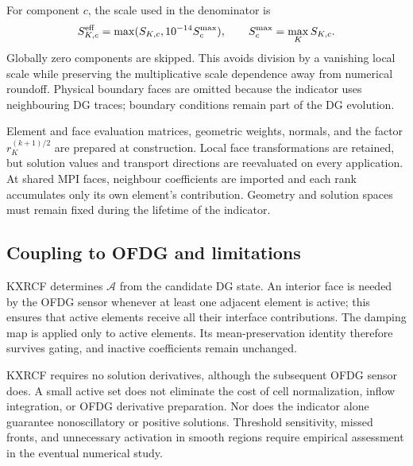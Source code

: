 For component $c$, the scale used in the denominator is
\begin{equation}
 S_{K,c}^{\rm eff}=\max(S_{K,c},10^{-14}S_c^{\max}),
 \qquad S_c^{\max}=\max_K S_{K,c}.
\end{equation}
Globally zero components are skipped.
This avoids division by a vanishing local scale while preserving the
multiplicative scale dependence away from numerical roundoff. Physical
boundary faces are omitted because the indicator uses neighbouring DG traces;
boundary conditions remain part of the DG evolution.

Element and face evaluation matrices, geometric weights, normals, and the
factor $r_K^{(k+1)/2}$ are prepared at construction. Local face transformations
are retained, but solution values and transport directions are reevaluated
on every application. At shared MPI faces, neighbour coefficients are imported
and each rank accumulates only its own element's contribution. Geometry and
solution spaces must remain fixed during the lifetime of the indicator.

\subsection{Coupling to OFDG and limitations}
KXRCF determines $\mathcal A$ from the candidate DG state. An interior face is
needed by the OFDG sensor whenever at least one adjacent element is active;
this ensures that active elements receive all their interface contributions.
The damping map is applied only to active elements. Its mean-preservation
identity therefore survives gating, and inactive coefficients remain unchanged.

KXRCF requires no solution derivatives, although the subsequent OFDG sensor
does. A small active set does not eliminate the cost of cell normalization,
inflow integration, or OFDG derivative preparation. Nor does the indicator
alone guarantee nonoscillatory or positive solutions. Threshold sensitivity,
missed fronts, and unnecessary activation in smooth regions require empirical
assessment in the eventual numerical study.
